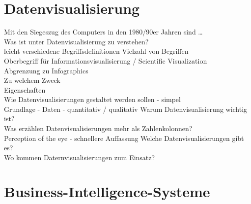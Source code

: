 \clearpage

\section{Datenvisualisierung}
Mit den Siegeszug des Computers in den 1980/90er Jahren sind \dots\\
Was ist unter Datenvisualisierung zu verstehen?\\
leicht verschiedene Begriffsdefinitionen
Vielzahl von Begriffen\\ 
Oberbegriff für Informationsvisualisierung / Scientific Visualization\\
Abgrenzung zu Infographics\\
Zu welchem Zweck\\
Eigenschaften\\
Wie Datenvisualisierungen gestaltet werden sollen - simpel\\
Grundlage - Daten - quantitativ / qualitativ
Warum Datenvisualisierung wichtig ist?\\
Was erzählen Datenvisualisierungen mehr als Zahlenkolonnen?\\
Perception of the eye - schnellere Auffassung
Welche Datenvisualisierungen gibt es?\\
Wo kommen Daternvisualisierungen zum Einsatz?\\






\clearpage
\section{Business-Intelligence-Systeme}

